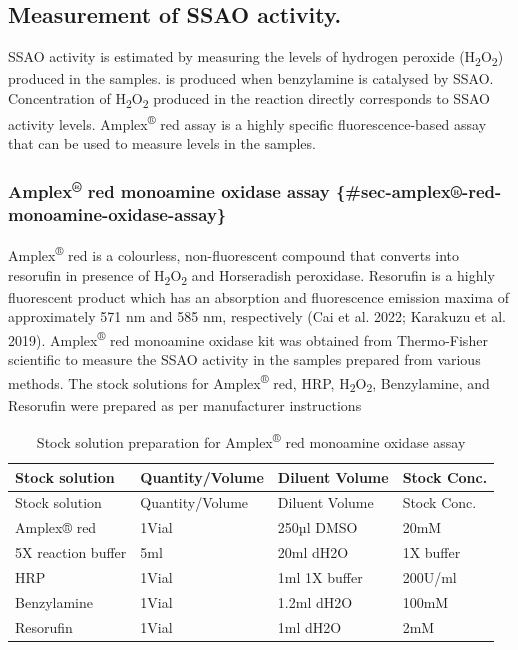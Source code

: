 \documentclass[
  letterpaper,
  DIV=11,
  numbers=noendperiod]{scrreprt}
\begin{document}
\subsection{\texorpdfstring{\textbf{Measurement of SSAO
activity.}}{Measurement of SSAO activity.}}\label{sec-measureSSAO}

SSAO activity is estimated by measuring the levels of hydrogen peroxide
(H\textsubscript{2}O\textsubscript{2}) produced in the samples. is
produced when benzylamine is catalysed by SSAO. Concentration of
H\textsubscript{2}O\textsubscript{2} produced in the reaction directly
corresponds to SSAO activity levels. Amplex\textsuperscript{®} red assay
is a highly specific fluorescence-based assay that can be used to
measure levels in the samples.

\subsubsection{\texorpdfstring{\textbf{Amplex}\textsuperscript{®}
\textbf{red monoamine oxidase assay}
\{\#sec-amplex®-red-monoamine-oxidase-assay\}}{Amplex® red monoamine oxidase assay \{\#sec-amplex®-red-monoamine-oxidase-assay\}}}\label{amplex-red-monoamine-oxidase-assay-sec-amplex-red-monoamine-oxidase-assay}

Amplex\textsuperscript{®} red is a colourless, non-fluorescent compound
that converts into resorufin in presence of
H\textsubscript{2}O\textsubscript{2} and Horseradish peroxidase.
Resorufin is a highly fluorescent product which has an absorption and
fluorescence emission maxima of approximately 571 nm and 585 nm,
respectively (Cai et al. 2022; Karakuzu et al. 2019).
Amplex\textsuperscript{®} red monoamine oxidase kit was obtained from
Thermo-Fisher scientific to measure the SSAO activity in the samples
prepared from various methods. The stock solutions for
Amplex\textsuperscript{®} red, HRP,
H\textsubscript{2}O\textsubscript{2}, Benzylamine, and Resorufin were
prepared as per manufacturer instructions

\begin{longtable}[]{@{}llll@{}}
\caption{Stock solution preparation for Amplex\textsuperscript{®} red
monoamine oxidase
assay}\label{tbl-amplex-red-stock-solution-prep}\tabularnewline
\toprule\noalign{}
Stock solution & Quantity/Volume & Diluent Volume & Stock Conc. \\
\midrule\noalign{}
\endfirsthead
\toprule\noalign{}
Stock solution & Quantity/Volume & Diluent Volume & Stock Conc. \\
\midrule\noalign{}
\endhead
\bottomrule\noalign{}
\endlastfoot
Amplex® red & 1Vial & 250µl DMSO & 20mM \\
5X reaction buffer & 5ml & 20ml dH2O & 1X buffer \\
HRP & 1Vial & 1ml 1X buffer & 200U/ml \\
Benzylamine & 1Vial & 1.2ml dH2O & 100mM \\
Resorufin & 1Vial & 1ml dH2O & 2mM \\
\end{longtable}
\end{document}
